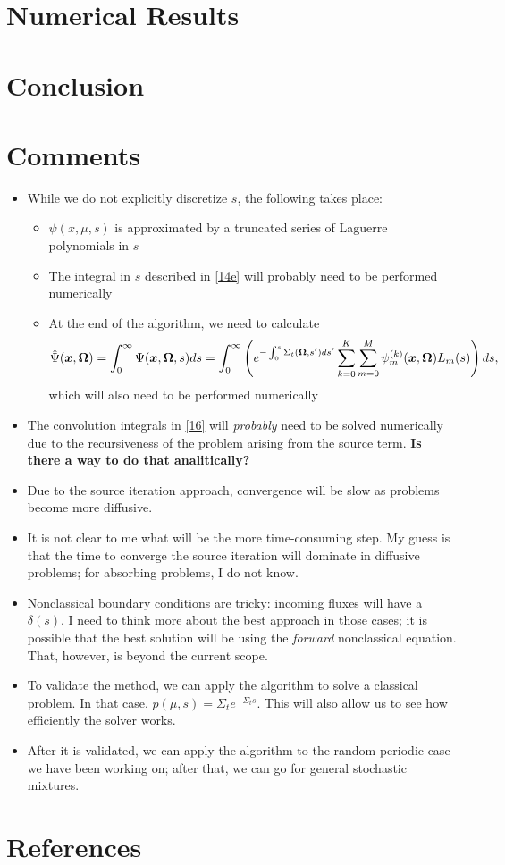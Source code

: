 \documentclass[preprint,12pt,authoryear]{elsarticle}
\newcommand{\ux}{{\bm x}}
\newcommand{\uom}{{\bf \Omega}}
\begin{document}
\section{Numerical Results}\label{sec5}
\setcounter{section}{5}

\section{Conclusion}\label{sec6}
\setcounter{section}{6}

\section*{Comments}
\setcounter{section}{4}

\begin{itemize}
\item While we do not explicitly discretize $s$, the following takes place:
\begin{itemize}
\item $\psi(x,\mu,s)$ is approximated by a truncated series of Laguerre polynomials in $s$
\item The integral in $s$ described in \cref{14e} will probably need to be performed numerically
\item At the end of the algorithm, we need to calculate
$$\hat\Psi(\ux,\uom) = \int_0^\infty \Psi(\ux,\uom,s)ds =  \int_0^{\infty} \left(e^{-\int_0^s\Sigma_t(\uom,s')ds'}\sum_{k=0}^{K}\sum_{m=0}^M\psi^{(k)}_m(\ux,\uom)L_m(s)\right)ds,$$
which will also need to be performed numerically 
\end{itemize}
\item The convolution integrals in \cref{16} will \textit{probably} need to be solved numerically due to the recursiveness of the problem arising from the source term. \textbf{Is there a way to do that analitically?}
\item Due to the source iteration approach, convergence will be slow as problems become more diffusive.
\item It is not clear to me what will be the more time-consuming step. My guess is that the time to converge the source iteration will dominate in diffusive problems; for absorbing problems, I do not know.   
\item Nonclassical boundary conditions are tricky: incoming fluxes will have a $\delta(s)$. I need to think more about the best approach in those cases; it is possible that the best solution will be using the \textit{forward} nonclassical equation. That, however, is beyond the current scope.
\item To validate the method, we can apply the algorithm to solve a classical problem. In that case, $p(\mu,s) = \Sigma_te^{-\Sigma_t s}$. This will also allow us to see how efficiently the solver works.
\item After it is validated, we can apply the algorithm to the random periodic case we have been working on; after that, we can go for general stochastic mixtures.
\end{itemize}

\section*{References}


\end{document}
